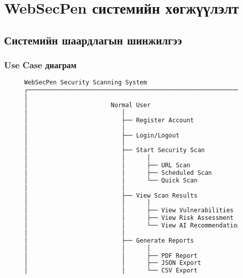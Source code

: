 \documentclass[main.tex]{subfiles}
\begin{document}
\section{WebSecPen системийн хөгжүүлэлт}

\subsection{Системийн шаардлагын шинжилгээ}

\subsubsection{Use Case диаграм}

\begin{figure}[h]
\centering
\begin{lstlisting}[language=bash, caption=WebSecPen системийн Use Case диаграм]
                    WebSecPen Security Scanning System
┌─────────────────────────────────────────────────────────────────┐
│                                                                 │
│                       Normal User                               │
│                          │                                      │
│                          ├── Register Account                   │
│                          │                                      │
│                          ├── Login/Logout                       │
│                          │                                      │
│                          ├── Start Security Scan               │
│                          │      │                              │
│                          │      ├── URL Scan                   │
│                          │      ├── Scheduled Scan             │
│                          │      └── Quick Scan                 │
│                          │                                      │
│                          ├── View Scan Results                 │
│                          │      │                              │
│                          │      ├── View Vulnerabilities       │
│                          │      ├── View Risk Assessment       │
│                          │      └── View AI Recommendations    │
│                          │                                      │
│                          ├── Generate Reports                  │
│                          │      │                              │
│                          │      ├── PDF Report                 │
│                          │      ├── JSON Export                │
│                          │      └── CSV Export                 │

\end{lstlisting}
\end{figure}
\end{document}
